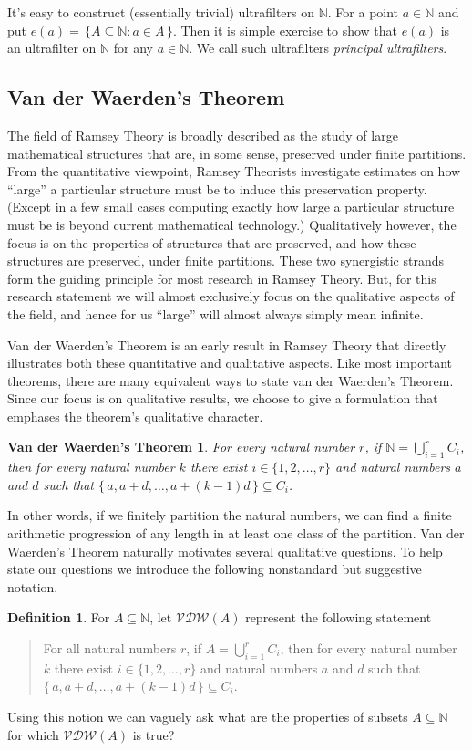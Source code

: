 \documentclass[12pt]{article}
\theoremstyle{plain}
\newtheorem{vdw}[thm]{Van der Waerden's Theorem}
\theoremstyle{definition}
\newtheorem{defn}[thm]{Definition}
\newcommand{\bbN}{\mathbb{N}}
\newcommand{\VDW}{\mathcal{VDW}}
\begin{document}
It's easy to construct (essentially trivial) ultrafilters on $\bbN$.
For a point $a \in \bbN$ and put $e(a) = \,\{ A \subseteq \bbN : a \in A
\,\}$.
Then it is simple exercise to show that $e(a)$ is an ultrafilter on
$\bbN$ for any $a \in \bbN$.
We call such ultrafilters \textsl{principal ultrafilters}. 

\subsection{Van der Waerden's Theorem}
The field of Ramsey Theory is broadly described as the study of large
mathematical structures that are, in some sense, preserved under
finite partitions.
From the quantitative viewpoint, Ramsey Theorists investigate
estimates on how ``large'' a particular structure must be to induce
this preservation property.
(Except in a few small cases computing exactly how large a particular
structure must be is beyond current mathematical technology.)
Qualitatively however, the focus is on the properties of structures that are preserved, and how these structures are preserved, under finite partitions.
These two synergistic strands form the guiding principle for most
research in Ramsey Theory.
But, for this research statement we will almost exclusively focus on
the qualitative aspects of the field, and hence for us ``large'' will
almost always simply mean infinite.


Van der Waerden's Theorem is an early\cite{Van-der-Waerden:1927fk}
result in Ramsey Theory that directly illustrates both these
quantitative and qualitative aspects.
Like most important theorems, there are many equivalent ways to state
van der Waerden's Theorem.
Since our focus is on qualitative results, we choose to give a
formulation that emphases the theorem's qualitative character. 
  \begin{vdw}
    For every natural number $r$, if\/ $\bbN = \bigcup_{i=1}^r C_i$,
    then for every natural number $k$ there exist $i \in \{1, 2,
    \ldots, r\}$ and natural numbers $a$ and $d$ such that $\{\, a,
    a+d, \ldots, a+(k-1)d\,\} \subseteq C_i$.
  \end{vdw}
In other words, if we finitely partition the natural numbers, we can
find a finite arithmetic progression of any length in at least one
class of the partition. 
Van der Waerden's Theorem naturally motivates several
qualitative questions. 
To help state our questions we introduce
the following nonstandard but suggestive notation.
  \begin{defn}
    For $A \subseteq \bbN$, let $\VDW(A)$ represent the
    following statement
      \begin{quote}
      For all natural numbers $r$, if $A = \bigcup_{i=1}^r C_i$, then
      for every natural number $k$ there exist $i \in \{1, 2,
      \ldots, r\}$ and natural numbers $a$ and $d$ such that $\{\, a,
      a+d, \ldots, a+(k-1)d\,\} \subseteq C_i$.
     \end{quote}
  \end{defn}
Using this notion we can vaguely ask what are the properties of
subsets $A \subseteq \bbN$ for which $\VDW(A)$ is true?



\end{document}
